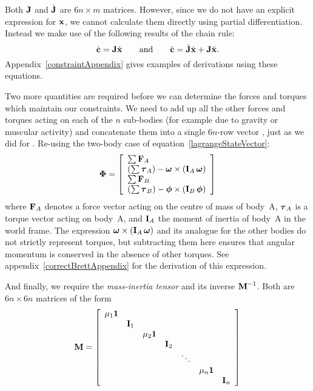 Both $\m{J}$ and $\dot{\m{J}}$ are $6n\times m$ matrices. However, since we do not
have an explicit expression for $\ve{x}$, we cannot calculate them directly using
partial differentiation. Instead we make use of the following results of the chain rule:
\begin{equation}
\label{cDotAndCDDot}
\dot{\ve{c}} = \m{J}\dot{\ve{x}} \quad\quad\mathrm{and}\quad\quad
\ddot{\ve{c}} = \dot{\m{J}}\dot{\ve{x}} + \m{J}\ddot{\ve{x}}.
\end{equation}
Appendix~\ref{constraintAppendix} gives examples of derivations using these equations.

Two more quantities are required before we can determine the forces and torques which maintain
our constraints. We need to add up all the other forces and torques acting on each of the $n$
sub-bodies (for example due to gravity or muscular activity) and concatenate them into a single
$6n$-row vector \ve{\Phi}, just as we did for . Re-using the two-body case of
equation~\ref{lagrangeStateVector}:
\begin{equation}
\ve{\Phi} = \left[\begin{array}{l}
    \sum \ve{F}_A \\
    \left( \sum \ve{\tau}_A \right) - \ve{\omega}\times(\m{I}_A\,\ve{\omega}) \\
    \sum \ve{F}_B \\
    \left( \sum \ve{\tau}_B \right) - \ve{\phi}\times(\m{I}_B\,\ve{\phi})
    \end{array}\right]
\end{equation}
where $\ve{F}_A$ denotes a force vector acting on the centre of mass of body~A, $\ve{\tau}_A$
is a torque vector acting on body~A, and $\m{I}_A$
the moment of inertia of body~A in the world frame. The expression
$\ve{\omega}\times(\m{I}_A\,\ve{\omega})$ and its analogue for the other bodies do
not strictly represent torques, but subtracting them here ensures that angular momentum is
conserved in the absence of other torques. See appendix~\ref{correctBrettAppendix} for the
derivation of this expression.

And finally, we require the {\em mass-inertia tensor}  and its inverse
$\m{M}^{-1}$. Both are $6n\times6n$ matrices of the form
\begin{equation}
\label{massInertiaTensor}
\m{M} = \left[ \begin{array}{ccccccc}
    \mu_1\m{1} \\ & \m{I}_1 \\ &&
    \mu_2\m{1} \\ &&& \m{I}_2 \\ &&&& \ddots \\ &&&&&
    \mu_n\m{1} \\ &&&&&& \m{I}_n
    \end{array}\right]
\end{equation}

